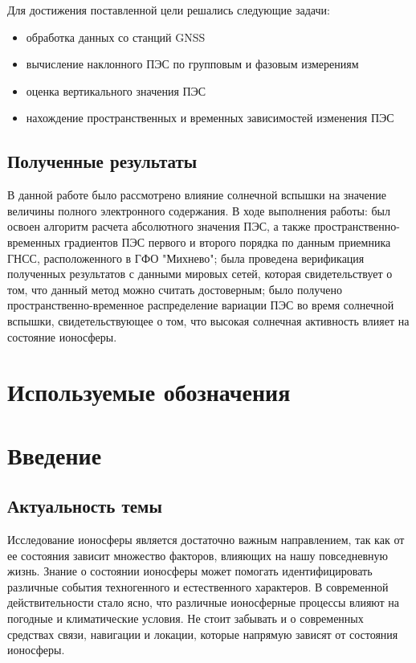 \documentclass[a4paper]{article}
\begin{document}
Для достижения поставленной цели решались следующие задачи:
\begin{itemize}
\item обработка данных со станций GNSS
\item вычисление наклонного ПЭС по групповым и фазовым измерениям
\item оценка вертикального значения ПЭС
\item нахождение пространственных и временных зависимостей изменения ПЭС
\end{itemize}

\subsection*{Полученные результаты}
В данной работе было рассмотрено влияние солнечной вспышки на значение величины полного электронного содержания. В ходе выполнения работы: был освоен алгоритм расчета абсолютного значения ПЭС, а также пространственно-временных градиентов ПЭС первого и второго порядка по данным приемника ГНСС, расположенного в ГФО "Михнево"; была проведена верификация полученных результатов с данными мировых сетей, которая свидетельствует о том, что данный метод можно считать достоверным; было получено пространственно-временное распределение вариации ПЭС во время солнечной вспышки, свидетельствующее о том, что высокая солнечная активность влияет на состояние ионосферы.

\newpage
\tableofcontents

\newpage
\section*{Используемые обозначения}

\newpage
\section*{Введение}
\subsection*{Актуальность темы}
Исследование ионосферы является достаточно важным направлением, так как от ее состояния зависит множество факторов, влияющих на нашу повседневную жизнь. Знание о состоянии ионосферы может помогать идентифицировать различные события техногенного и естественного характеров. В современной действительности стало ясно, что различные ионосферные процессы влияют на погодные и климатические условия. Не стоит забывать и о современных средствах связи, навигации и локации, которые напрямую зависят от состояния ионосферы.
\end{document}

